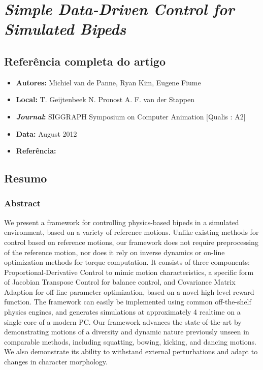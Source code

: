 \section{\textit{Simple Data-Driven Control for Simulated Bipeds}}

\subsection{Referência completa do artigo}

\begin{itemize}
  \item \textbf{Autores:} Michiel van de Panne, Ryan Kim, Eugene Fiume
  \item \textbf{Local:} T. Geijtenbeek N. Pronost A. F. van der Stappen
  \item \textbf{\textit{Journal}:} SIGGRAPH Symposium on Computer Animation [Qualis : A2]
  \item \textbf{Data:} August 2012
  \item \textbf{Referência:} 
\end{itemize}


\subsection{Resumo}

\subsubsection{Abstract}
We present a framework for controlling physics-based bipeds in a simulated environment, based on a variety of reference motions. Unlike existing methods for control based on reference motions, our framework does not require preprocessing of the reference motion, nor does it rely on inverse dynamics or on-line optimization methods for torque computation. It consists of three components: Proportional-Derivative Control to mimic motion characteristics, a specific form of Jacobian Transpose Control for balance control, and Covariance Matrix Adaption for off-line parameter optimization, based on a novel high-level reward function. The framework can easily be implemented using common off-the-shelf physics engines, and generates simulations at approximately 4 realtime on a single core of a modern PC. Our framework advances the state-of-the-art by demonstrating motions of a diversity and dynamic nature previously unseen in comparable methods, including squatting, bowing, kicking, and dancing motions. We also demonstrate its ability to withstand external perturbations and adapt to changes in character morphology.


